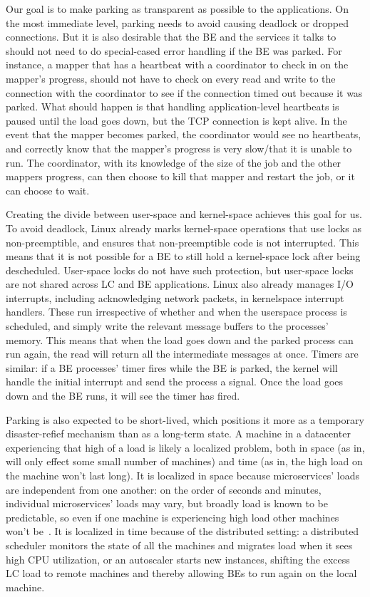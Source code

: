 Our goal is to make parking as transparent as possible to the applications. On
the most immediate level, parking needs to avoid causing deadlock or dropped
connections. But it is also desirable that the BE and the services it talks to
should not need to do special-cased error handling if the BE was parked. For
instance, a mapper that has a heartbeat with a coordinator to check in on the
mapper's progress, should not have to check on every read and write to the
connection with the coordinator to see if the connection timed out because it
was parked. What should happen is that handling application-level heartbeats is
paused until the load goes down, but the TCP connection is kept alive. In the
event that the mapper becomes parked, the coordinator would see no heartbeats,
and correctly know that the mapper's progress is very slow/that it is unable to
run. The coordinator, with its knowledge of the size of the job and the other
mappers progress, can then choose to kill that mapper and restart the job, or it
can choose to wait.


Creating the divide between user-space and kernel-space achieves this goal for
us. To avoid deadlock, Linux already marks kernel-space operations that use
locks as non-preemptible, and ensures that non-preemptible code is not
interrupted. This means that it is not possible for a BE to still hold a
kernel-space lock after being descheduled. User-space locks do not have such
protection, but user-space locks are not shared across LC and BE applications.
Linux also already manages I/O interrupts, including acknowledging network
packets, in kernelspace interrupt handlers. These run irrespective of whether
and when the userspace process is scheduled, and simply write the relevant
message buffers to the processes' memory. This means that when the load goes
down and the parked process can run again, the read will return all the
intermediate messages at once. Timers are similar: if a BE processes' timer
fires while the BE is parked, the kernel will handle the initial interrupt and
send the process a signal. Once the load goes down and the BE runs, it will see
the timer has fired.

Parking is also expected to be short-lived, which positions it more as a
temporary disaster-refief mechanism than as a long-term state. A machine in a
datacenter experiencing that high of a load is likely a localized problem, both
in space (as in, will only effect some small number of machines) and time (as
in, the high load on the machine won't last long). It is localized in space
because microservices' loads are independent from one another: on the order of
seconds and minutes, individual microservices' loads may vary, but broadly load
is known to be predictable, so even if one machine is experiencing high load
other machines won't be~\cite{TODO}. It is localized in time because of the
distributed setting: a distributed scheduler monitors the state of all the
machines and migrates load when it sees high CPU utilization, or an autoscaler
starts new instances, shifting the excess LC load to remote machines and thereby
allowing BEs to run again on the local machine.



